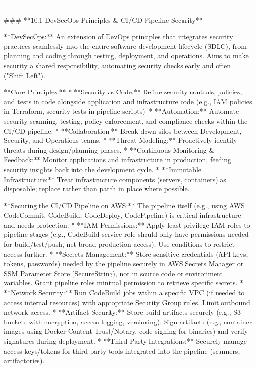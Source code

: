\documentclass{article}
\begin{document}
---

### **10.1 DevSecOps Principles & CI/CD Pipeline Security**

**DevSecOps:** An extension of DevOps principles that integrates security practices seamlessly into the entire software development lifecycle (SDLC), from planning and coding through testing, deployment, and operations. Aims to make security a shared responsibility, automating security checks early and often ("Shift Left").

**Core Principles:**
* **Security as Code:** Define security controls, policies, and tests in code alongside application and infrastructure code (e.g., IAM policies in Terraform, security tests in pipeline scripts).
* **Automation:** Automate security scanning, testing, policy enforcement, and compliance checks within the CI/CD pipeline.
* **Collaboration:** Break down silos between Development, Security, and Operations teams.
* **Threat Modeling:** Proactively identify threats during design/planning phases.
* **Continuous Monitoring & Feedback:** Monitor applications and infrastructure in production, feeding security insights back into the development cycle.
* **Immutable Infrastructure:** Treat infrastructure components (servers, containers) as disposable; replace rather than patch in place where possible.

**Securing the CI/CD Pipeline on AWS:**
The pipeline itself (e.g., using AWS CodeCommit, CodeBuild, CodeDeploy, CodePipeline) is critical infrastructure and needs protection:
* **IAM Permissions:** Apply least privilege IAM roles to pipeline stages (e.g., CodeBuild service role should only have permissions needed for build/test/push, not broad production access). Use conditions to restrict access further.
* **Secrets Management:** Store sensitive credentials (API keys, tokens, passwords) needed by the pipeline securely in AWS Secrets Manager or SSM Parameter Store (SecureString), not in source code or environment variables. Grant pipeline roles minimal permission to retrieve specific secrets.
* **Network Security:** Run CodeBuild jobs within a specific VPC (if needed to access internal resources) with appropriate Security Group rules. Limit outbound network access.
* **Artifact Security:** Store build artifacts securely (e.g., S3 buckets with encryption, access logging, versioning). Sign artifacts (e.g., container images using Docker Content Trust/Notary, code signing for binaries) and verify signatures during deployment.
* **Third-Party Integrations:** Securely manage access keys/tokens for third-party tools integrated into the pipeline (scanners, artifactories).
\end{document}

